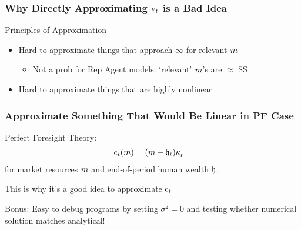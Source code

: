 \documentclass{beamer}
\begin{document}
\begin{frame}
\frametitle{Why Directly Approximating $\mathrm{v}_{t}$ is a Bad Idea}

Principles of Approximation

\begin{itemize}
\item Hard to approximate things that approach $\infty$ for relevant $m$
\begin{itemize}
\item Not a prob for Rep Agent models: `relevant' $m$'s are $\approx$ SS
\end{itemize}
\item Hard to approximate things that are highly nonlinear 
\end{itemize}


\end{frame}


\begin{frame}
\frametitle{Approximate Something That Would Be Linear in PF Case}

\medskip

Perfect Foresight Theory:
\begin{equation}\begin{gathered}\begin{aligned}
  \cFunc_{t}(\mRat)  & = (\mRat+\hEnd_{t})\MPCmin_{t} 
\end{aligned}\end{gathered}\end{equation}
for market resources $m$ and end-of-period human wealth $\mathfrak{h}$.


\medskip\medskip
\pause 

This is why it's a good idea to approximate $\mathrm{c}_{t}$ 

\pause \medskip\medskip

Bonus: Easy to debug programs by setting $\sigma^{2} = 0$ and
testing whether numerical solution matches analytical!

\end{frame}
\end{document}
